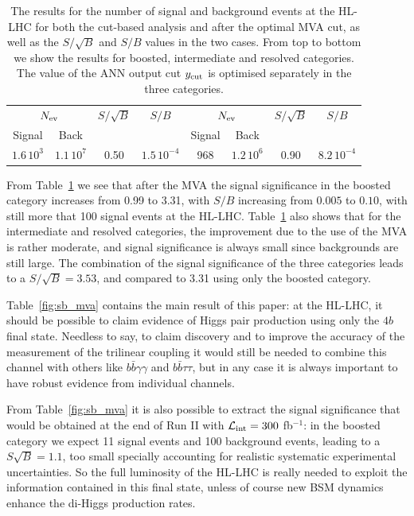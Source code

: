 \begin{table}[t]
\begin{tabular}{c|c|c|c||c|c|c|c}
    \hline
    \multicolumn{2}{c|}{$N_{\rm ev}$} &  $S/\sqrt{B}$  & $S/B$
    & \multicolumn{2}{c|}{$N_{\rm ev}$} &  $S/\sqrt{B}$  & $S/B$\\
        Signal & Back   &     &   &  Signal & Back   &     &    \\
    \hline
    $1.6\,10^{3}$   &   $1.1\,10^{7}$   & 0.50     &  $1.5\,10^{-4}$   & 968 &
    $1.2\,10^{6}$  & 0.90 & $8.2\,10^{-4}$ \\
        \hline
  \end{tabular}
  \caption{\small The results for the number of signal and
    background events
    at the HL-LHC for both the cut-based analysis and after the
    optimal MVA cut, as well as the $S/\sqrt{B}$ and $S/B$
    values in the two cases.
    From top to bottom we show the results for boosted,
    intermediate and resolved categories.
    The value of the ANN output cut $y_{\rm cut}$
    is optimised separately in the
    three categories.
    \label{table:cutflowMVA}
  }
\end{table}

From Table~\ref{table:cutflowMVA} we see that after the
MVA the signal significance in the boosted category increases
from 0.99 to 3.31, with $S/B$ increasing from $0.005$ to $0.10$,
with still more that 100 signal events at the HL-LHC.
%
Table~\ref{table:cutflowMVA} also shows that for the intermediate
and resolved categories, the improvement due to the use
of the MVA is rather moderate, and signal significance is always
small since backgrounds are still  large.
%
The combination of the signal significance of the
three categories leads to a $S/\sqrt{B}=3.53$, and compared
to 3.31 using only the boosted category.


Table~\ref{fig:sb_mva} contains the main result of this paper:
at the HL-LHC, it should be possible to claim evidence of
Higgs pair production using only the $4b$ final state.
%
Needless to say, to claim discovery and to improve the accuracy
of the measurement of the trilinear coupling it would still
be needed to combine this channel with others like
$b\bar{b}\gamma\gamma$ and $b\bar{b}\tau\tau$, but in any case
it is always important to have robust evidence from
individual channels.

From Table~\ref{fig:sb_mva} it is also possible to
extract the signal significance that would be obtained
at the end of Run II with $\mathcal{L}_{\rm int}=300$ fb$^{-1}$:
in the boosted category we expect 11 signal events and 100 background
events, leading to a $S\sqrt{B}=1.1$, too small specially accounting
for realistic systematic experimental uncertainties.
%
So the full luminosity of the HL-LHC is really needed to exploit
the information contained in this final state, unless of course
new BSM dynamics enhance the di-Higgs production rates.

